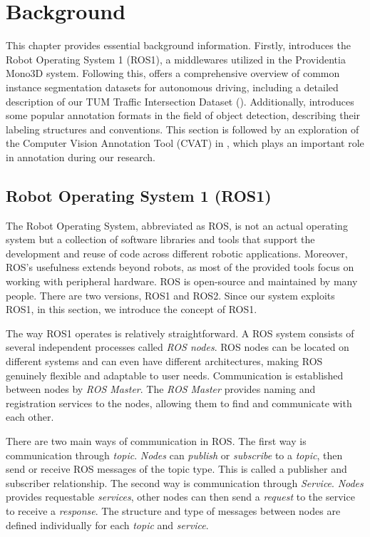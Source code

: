 \chapter{Background} \label{chap:two}%

This chapter provides essential background information. Firstly,  introduces the Robot Operating System 1 (ROS1), a middlewares utilized in the Providentia Mono3D system. Following this,  offers a comprehensive overview of common instance segmentation datasets for autonomous driving, including a detailed description of our TUM Traffic Intersection Dataset (). Additionally,  introduces some popular annotation formats in the field of object detection, describing their labeling structures and conventions. This section is followed by an exploration of the Computer Vision Annotation Tool (CVAT) in , which plays an important role in annotation during our research.

\section{Robot Operating System 1 (ROS1)} \label{sec:ros}

The Robot Operating System, abbreviated as ROS, is not an actual operating system but a collection of software libraries and tools that support the development and reuse of code across different robotic applications. Moreover, ROS's usefulness extends beyond robots, as most of the provided tools focus on working with peripheral hardware. ROS is open-source and maintained by many people. There are two versions, ROS1 and ROS2. Since our system exploits ROS1, in this section, we introduce the concept of ROS1. 

The way ROS1 operates is relatively straightforward. A ROS system consists of several independent processes called \textit{ROS nodes}. ROS nodes can be located on different systems and can even have different architectures, making ROS genuinely flexible and adaptable to user needs. Communication is established between nodes by \textit{ROS Master}. The \textit{ROS Master} provides naming and registration services to the nodes, allowing them to find and communicate with each other.

There are two main ways of communication in ROS. The first way is communication through \textit{topic}. \textit{Nodes} can \textit{publish} or \textit{subscribe} to a \textit{topic}, then send or receive ROS messages of the topic type. This is called a publisher and subscriber relationship. The second way is communication through \textit{Service}. \textit{Nodes} provides requestable \textit{services}, other nodes can then send a \textit{request} to the service to receive a \textit{response}. The structure and type of messages between nodes are defined individually for each \textit{topic} and \textit{service}.  

